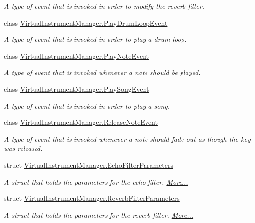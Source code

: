 \begin{DoxyCompactItemize}
\begin{DoxyCompactList}\small\item\em A type of event that is invoked in order to modify the reverb filter. \end{DoxyCompactList}\item 
class \hyperlink{class_virtual_instrument_manager_1_1_play_drum_loop_event}{Virtual\+Instrument\+Manager.\+Play\+Drum\+Loop\+Event}
\begin{DoxyCompactList}\small\item\em A type of event that is invoked in order to play a drum loop. \end{DoxyCompactList}\item 
class \hyperlink{class_virtual_instrument_manager_1_1_play_note_event}{Virtual\+Instrument\+Manager.\+Play\+Note\+Event}
\begin{DoxyCompactList}\small\item\em A type of event that is invoked whenever a note should be played. \end{DoxyCompactList}\item 
class \hyperlink{class_virtual_instrument_manager_1_1_play_song_event}{Virtual\+Instrument\+Manager.\+Play\+Song\+Event}
\begin{DoxyCompactList}\small\item\em A type of event that is invoked in order to play a song. \end{DoxyCompactList}\item 
class \hyperlink{class_virtual_instrument_manager_1_1_release_note_event}{Virtual\+Instrument\+Manager.\+Release\+Note\+Event}
\begin{DoxyCompactList}\small\item\em A type of event that is invoked whenever a note should fade out as though the key was released. \end{DoxyCompactList}\item 
struct \hyperlink{group___virtual_instrument_manager_event_types_struct_virtual_instrument_manager_1_1_echo_filter_parameters}{Virtual\+Instrument\+Manager.\+Echo\+Filter\+Parameters}
\begin{DoxyCompactList}\small\item\em A struct that holds the parameters for the echo filter.  \hyperlink{group___virtual_instrument_manager_event_types_struct_virtual_instrument_manager_1_1_echo_filter_parameters}{More...}\end{DoxyCompactList}\item 
struct \hyperlink{group___virtual_instrument_manager_event_types_struct_virtual_instrument_manager_1_1_reverb_filter_parameters}{Virtual\+Instrument\+Manager.\+Reverb\+Filter\+Parameters}
\begin{DoxyCompactList}\small\item\em A struct that holds the parameters for the reverb filter.  \hyperlink{group___virtual_instrument_manager_event_types_struct_virtual_instrument_manager_1_1_reverb_filter_parameters}{More...}\end{DoxyCompactList}\end{DoxyCompactItemize}
